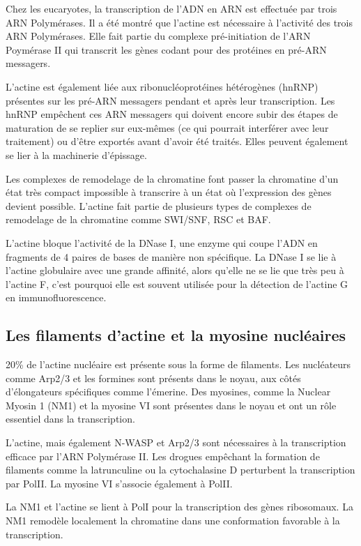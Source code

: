 Chez les eucaryotes, la transcription de l'ADN en ARN est effectuée par trois ARN Polymérases. Il a été montré que l'actine est nécessaire à l'activité des trois ARN Polymérases. Elle fait partie du complexe pré-initiation de l'ARN Poymérase II qui transcrit les gènes codant pour des protéines en pré-ARN messagers.

L'actine est également liée aux ribonucléoprotéines hétérogènes (hnRNP) présentes sur les pré-ARN messagers pendant et après leur transcription. Les hnRNP empêchent ces ARN messagers qui doivent encore subir des étapes de maturation de se replier sur eux-mêmes (ce qui pourrait interférer avec leur traitement) ou d'être exportés avant d'avoir été traités. Elles peuvent également se lier à la machinerie d'épissage. 

Les complexes de remodelage de la chromatine font passer la chromatine d'un état très compact impossible à transcrire à un état où l'expression des gènes devient possible. L'actine fait partie de plusieurs types de complexes de remodelage de la chromatine comme SWI/SNF, RSC et BAF. 

L'actine bloque l'activité de la DNase I, une enzyme qui coupe l'ADN en fragments de 4 paires de bases de manière non spécifique. La DNase I se lie à l'actine globulaire avec une grande affinité, alors qu'elle ne se lie que très peu à l'actine F, c'est pourquoi elle est souvent utilisée pour la détection de l'actine G en immunofluorescence. 

\subsection{Les filaments d'actine et la myosine nucléaires}

20\% de l'actine nucléaire est présente sous la forme de filaments. Les nucléateurs comme Arp2/3 et les formines sont présents dans le noyau, aux côtés d'élongateurs spécifiques comme l'émerine. 
Des myosines, comme la Nuclear Myosin 1 (NM1) et la myosine VI sont présentes dans le noyau et ont un rôle essentiel dans la transcription. 

L'actine, mais également N-WASP et Arp2/3 sont nécessaires à la transcription efficace par l'ARN Polymérase II. Les drogues empêchant la formation de filaments comme la latrunculine ou la cytochalasine D perturbent la transcription par PolII. La myosine VI s'associe également à PolII. 

La NM1 et l'actine se lient à PolI pour la transcription des gènes ribosomaux. La NM1 remodèle localement la chromatine dans une conformation favorable à la transcription. 

